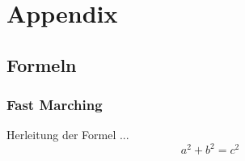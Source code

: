 \chapter{Appendix}\label{cha::appendix}

\section{Formeln}
\subsection{Fast Marching}
Herleitung der Formel ...
\begin{equation}
 a^2 + b^2 = c^2
\end{equation}

